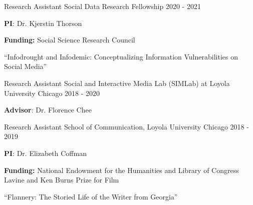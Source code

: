 

\begin{cventries}

  \cventry
    {Research Assistant} %
    {Social Data Research Fellowship} %
    {} %
    {2020 - 2021} %
    {
      \begin{cvitems} %
              \item {\textbf{PI}: Dr. Kjerstin Thorson}
                \item {\textbf{Funding: }Social Science Research Council}
                \item {“Infodrought and Infodemic: Conceptualizing Information Vulnerabilities on Social Media”}
      \end{cvitems}
    }

    \cventry
    {Research Assistant} %
    {Social and Interactive Media Lab (SIMLab) at Loyola University Chicago} %
    {} %
    {2018 - 2020} %
    {
      \begin{cvitems} %
        \item {\textbf{Advisor}: Dr. Florence Chee}
      \end{cvitems}
    }
    
    \cventry
    {Research Assistant} %
    {School of Communication, Loyola University Chicago} %
    {} %
    {2018 - 2019} %
    {
      \begin{cvitems} %
              \item {\textbf{PI}: Dr. Elizabeth Coffman}
                \item {\textbf{Funding: }National Endowment for the Humanities and Library of Congress Lavine and Ken Burns Prize for Film}
                \item {“Flannery: The Storied Life of the Writer from Georgia”}
      \end{cvitems}
    }

\end{cventries}





